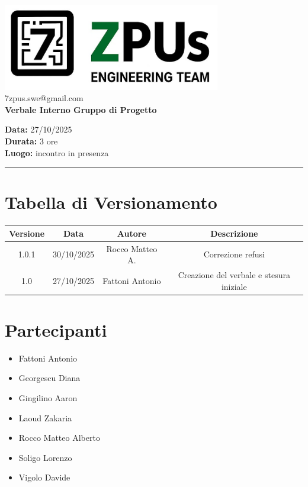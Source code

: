 \documentclass[a4paper,12pt]{article}
\begin{document}
\begin{center}
    \includegraphics[width=9.5cm]{../../../assets/logo7zpus.jpg}\\
    \small\hspace{10cm} 7zpus.swe@gmail.com\\
    \Large \textbf{Verbale Interno Gruppo di Progetto}\\
    \vspace{0.5cm}
\end{center}

\noindent
\textbf{Data:} 27/10/2025 \\
\textbf{Durata:}  3 ore\\
\textbf{Luogo:} incontro in presenza

\vspace{0.3cm}
\hrule
\vspace{0.5cm}

\tableofcontents

\newpage

\section*{Tabella di Versionamento}
    \begin{tabular}{|c|c|c|c|}
        \hline
        \textbf{Versione} & \textbf{Data} & \textbf{Autore} & \textbf{Descrizione} \\
        \hline
        1.0.1 & 30/10/2025 & Rocco Matteo A. & Correzione refusi \\
        \hline
        1.0 & 27/10/2025 & Fattoni Antonio & Creazione del verbale e stesura iniziale \\
        \hline
    \end{tabular}

\section*{Partecipanti}
\begin{itemize}[noitemsep]
    \item Fattoni Antonio 
    \item Georgescu Diana
    \item Gingilino Aaron
    \item Laoud Zakaria
    \item Rocco Matteo Alberto
    \item Soligo Lorenzo
    \item Vigolo Davide
\end{itemize}
\end{document}
